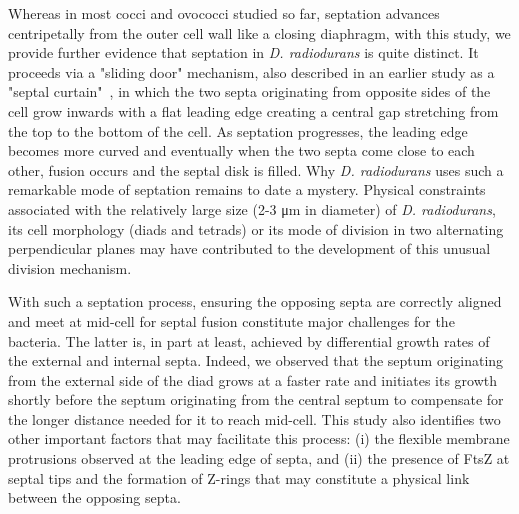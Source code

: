 Whereas in most cocci and ovococci studied so far, septation advances centripetally from the outer cell wall like a closing diaphragm, with this study, we provide further evidence that septation in \textit{D. radiodurans} is quite distinct.
It proceeds via a "sliding door" mechanism, also described in an earlier study as a "septal curtain"~\cite{murrayCellDivisionDeinococcus1983}, in which the two septa originating from opposite sides of the cell grow inwards with a flat leading edge creating a central gap stretching from the top to the bottom of the cell.
As septation progresses, the leading edge becomes more curved and eventually when the two septa come close to each other, fusion occurs and the septal disk is filled.
Why \textit{D. radiodurans} uses such a remarkable mode of septation remains to date a mystery.
Physical constraints associated with the relatively large size (2-3 μm in diameter) of \textit{D. radiodurans}, its cell morphology (diads and tetrads) or its mode of division in two alternating perpendicular planes may have contributed to the development of this unusual division mechanism.

With such a septation process, ensuring the opposing septa are correctly aligned and meet at mid-cell for septal fusion constitute major challenges for the bacteria.
The latter is, in part at least, achieved by differential growth rates of the external and internal septa.
Indeed, we observed that the septum originating from the external side of the diad grows at a faster rate and initiates its growth shortly before the septum originating from the central septum to compensate for the longer distance needed for it to reach mid-cell.
This study also identifies two other important factors that may facilitate this process: (i) the flexible membrane protrusions observed at the leading edge of septa, and (ii) the presence of FtsZ at septal tips and the formation of Z-rings that may constitute a physical link between the opposing septa.


